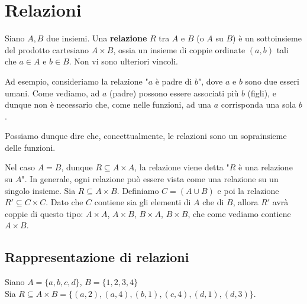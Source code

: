 \documentclass[12pt]{report}
\begin{document}
	\chapter{Relazioni}
	
	\begin{definizione}{}{}
		Siano $A, B$ due insiemi. Una \textbf{relazione} $R$ tra $A$ e $B$ (o $A$ su $B$) è un sottoinsieme del prodotto cartesiano $A \times B$, ossia un insieme di coppie ordinate $(a, b)$ tali che $a \in A$ e $b \in B$. Non vi sono ulteriori vincoli.
	\end{definizione}
	
	Ad esempio, consideriamo la relazione "$a$ è padre di $b$", dove $a$ e $b$ sono due esseri umani. Come vediamo, ad $a$ (padre) possono essere associati più $b$ (figli), e dunque non è necessario che, come nelle funzioni, ad una $a$ corrisponda una sola $b$.
	
	Possiamo dunque dire che, concettualmente, le relazioni sono un soprainsieme delle funzioni.
	
	\begin{osservazione}{}{}
		Nel caso $A = B$, dunque $R \subseteq A \times A$, la relazione viene detta "$R$ è una relazione su $A$". In generale, ogni relazione può essere vista come una relazione su un singolo insieme.
		Sia $R \subseteq A \times B$. Definiamo $C = (A \cup B)$ e poi la relazione $R' \subseteq C \times C$. Dato che $C$ contiene sia gli elementi di $A$ che di $B$, allora $R'$ avrà coppie di questo tipo: $A \times A$, $A \times B$, $B \times A$, $B \times B$, che come vediamo contiene $A \times B$.
	\end{osservazione}
	
	\section{Rappresentazione di relazioni}
	Siano $A = \{a, b, c, d\}$, $B = \{1, 2, 3, 4\}$\\
	Sia $R \subseteq A \times B = \{(a, 2), (a, 4), (b, 1), (c, 4), (d, 1), (d, 3)\}$.
	
\end{document}
